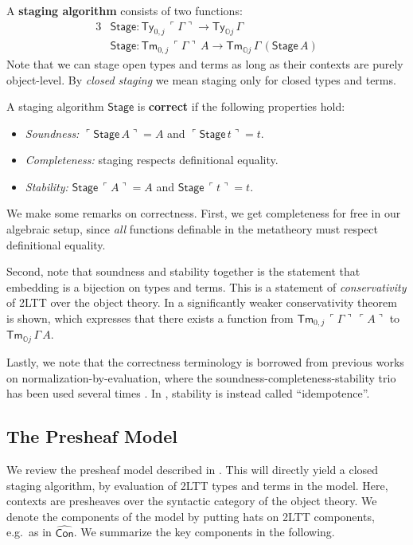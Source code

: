 \documentclass[acmsmall]{acmart}
\newcommand{\msf}[1]{\mathsf{#1}}
\newcommand{\mbb}[1]{\mathbb{#1}}
\newcommand{\wh}[1]{\widehat{#1}}
\newcommand{\mbbo}{\mbb{O}}
\newcommand{\Ty}{\msf{Ty}}
\newcommand{\Tm}{\msf{Tm}}
\newcommand{\hCon}{\wh{\msf{Con}}}
\newcommand{\emb}[1]{\ulcorner#1\urcorner}
\newcommand{\Stage}{\msf{Stage}}
\theoremstyle{remark}
\begin{document}
\begin{definition}
A \textbf{staging algorithm} consists of two functions:
  \begin{alignat*}{3}
    & \Stage : \Ty_{0,j}\,\emb{\Gamma} \to \Ty_{\mbbo j}\,\Gamma \\
    & \Stage : \Tm_{0,j}\,\emb{\Gamma}\,A \to \Tm_{\mbbo j}\,\Gamma\,(\Stage\,A)
  \end{alignat*}
Note that we can stage open types and terms as long as their contexts are purely
object-level. By \emph{closed staging} we mean staging only for closed types and
terms.
\end{definition}
\begin{definition}
  A staging algorithm $\Stage$ is \textbf{correct} if the following properties hold:
  \begin{itemize}
  \item \emph{Soundness:} $\emb{\Stage\,A} = A$ and $\emb{\Stage\,t} = t$.
  \item \emph{Completeness:} staging respects definitional equality.
  \item \emph{Stability:} $\Stage\,\emb{A} = A$ and $\Stage\,\emb{t} = t$.
  \end{itemize}
\end{definition}
We make some remarks on correctness. First, we get completeness for free in our
algebraic setup, since \emph{all} functions definable in the metatheory must
respect definitional equality.

Second, note that soundness and stability together is the statement that
embedding is a bijection on types and terms. This is a statement of
\emph{conservativity} of 2LTT over the object theory. In \cite{TODO} a
significantly weaker conservativity theorem is shown, which expresses that there
exists a function from $\Tm_{0,j}\,\emb{\Gamma}\,\emb{A}$ to $\Tm_{\mbbo
  j}\,\Gamma\,A$.

Lastly, we note that the correctness terminology is borrowed from previous works
on normalization-by-evaluation, where the soundness-completeness-stability trio
has been used several times \cite{TODO}. In \cite{cubicalnbe}, stability is
instead called ``idempotence''.

\subsection{The Presheaf Model}

We review the presheaf model described in \cite[Section~2.5.3]{twolevel}.  This
will directly yield a closed staging algorithm, by evaluation of 2LTT types and
terms in the model. Here, contexts are presheaves over the syntactic category of
the object theory. We denote the components of the model by putting hats on 2LTT
components, e.g.\ as in $\hCon$. We summarize the key components in the
following.
\end{document}
